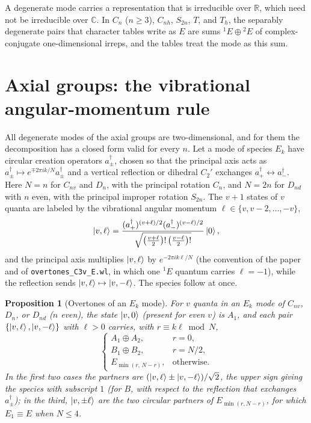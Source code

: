 \documentclass[11pt]{article}
\newtheorem{proposition}{Proposition}
\begin{document}
A degenerate mode carries a representation that is irreducible over $\mathbb R$, which need not be irreducible over $\mathbb C$. In $C_n$ ($n\ge3$), $C_{nh}$, $S_{2n}$, $T$, and $T_h$, the separably degenerate pairs that character tables write as $E$ are sums ${}^1E\oplus{}^2E$ of complex-conjugate one-dimensional irreps, and the tables treat the mode as this sum.

\section{Axial groups: the vibrational angular-momentum rule}

All degenerate modes of the axial groups are two-dimensional, and for them the decomposition has a closed form valid for every $n$. Let a mode of species $E_k$ have circular creation operators $a^\dagger_\pm$, chosen so that the principal axis acts as $a^\dagger_\pm\mapsto e^{\mp2\pi ik/N}a^\dagger_\pm$ and a vertical reflection or dihedral $C_2'$ exchanges $a^\dagger_+\leftrightarrow a^\dagger_-$. Here $N=n$ for $C_{nv}$ and $D_n$, with the principal rotation $C_n$, and $N=2n$ for $D_{nd}$ with $n$ even, with the principal improper rotation $S_{2n}$. The $v+1$ states of $v$ quanta are labeled by the vibrational angular momentum $\ell\in\{v,v-2,\ldots,-v\}$,
\begin{equation}
\ket{v,\ell}=\frac{(a^\dagger_+)^{(v+\ell)/2}(a^\dagger_-)^{(v-\ell)/2}}{\sqrt{\bigl(\tfrac{v+\ell}{2}\bigr)!\,\bigl(\tfrac{v-\ell}{2}\bigr)!}}\ket{0},
\label{eq:vl}
\end{equation}
and the principal axis multiplies $\ket{v,\ell}$ by $e^{-2\pi ik\ell/N}$ (the convention of the paper and of \texttt{overtones\_C3v\_E.wl}, in which one ${}^1E$ quantum carries $\ell=-1$), while the reflection sends $\ket{v,\ell}\mapsto\ket{v,-\ell}$. The species follow at once.

\begin{proposition}[Overtones of an $E_k$ mode]
\label{prop:lrule}
For $v$ quanta in an $E_k$ mode of $C_{nv}$, $D_n$, or $D_{nd}$ ($n$ even), the state $\ket{v,0}$ (present for even $v$) is $A_1$, and each pair $\{\ket{v,\ell},\ket{v,-\ell}\}$ with $\ell>0$ carries, with $r\equiv k\ell\bmod N$,
\begin{equation}
\begin{cases}
A_1\oplus A_2, & r=0,\\
B_1\oplus B_2, & r=N/2,\\
E_{\min(r,\,N-r)}, & \text{otherwise}.
\end{cases}
\label{eq:lrule}
\end{equation}
In the first two cases the partners are $(\ket{v,\ell}\pm\ket{v,-\ell})/\sqrt2$, the upper sign giving the species with subscript $1$ (for $B$, with respect to the reflection that exchanges $a^\dagger_\pm$); in the third, $\ket{v,\pm\ell}$ are the two circular partners of $E_{\min(r,N-r)}$, for which $E_1\equiv E$ when $N\le4$.
\end{proposition}
\end{document}

